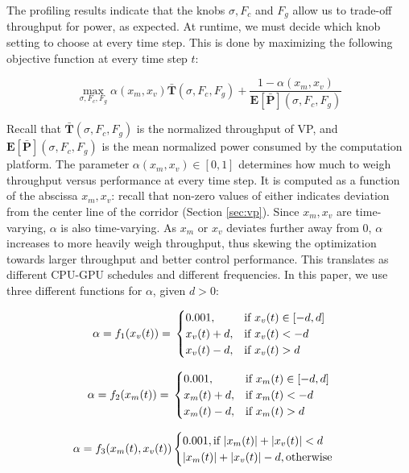 
The profiling results indicate that the knobs $\sigma, F_c$ and $F_g$ allow us to trade-off throughput for power, as expected.
At runtime, we must decide which knob setting to choose at every time step. 
This is done by maximizing the following objective function at every time step $t$:

\begin{equation}
\max_{\sigma,F_{c},F_{g}} \alpha(x_m,x_v)\mathbf{\bar{T}}(\sigma,F_{c},F_{g}) + \frac{1-\alpha(x_m,x_v)}{\mathbf{E[\bar{P}]}(\sigma,F_{c},F_{g})}
\label{eq:cost_runtime}
\end{equation}

Recall that $\mathbf{\bar{T}}(\sigma,F_{c},F_{g})$ is the normalized throughput of VP, and $\mathbf{E[\bar{P}]}(\sigma,F_{c},F_{g})$ is the mean normalized power consumed by the computation platform.
The parameter $\alpha(x_m,x_v) \in [0,1]$ determines how much to weigh throughput versus performance at every time step. 
It is computed as a function of the abscissa $x_m,x_v$: recall that non-zero values of either indicates deviation from the center line of the corridor (Section \ref{sec:vp}). 
Since $x_m,x_v$ are time-varying, $\alpha$ is also time-varying.
As $x_m$ or $x_v$ deviates further away from 0, $\alpha$ increases to more heavily weigh throughput, thus skewing the optimization towards larger throughput and better control performance.
This translates as different CPU-GPU schedules and different frequencies.
In this paper, we use three different functions for $\alpha$, given $d >0$:

{\footnotesize{
		\begin{equation}
		\alpha= f_1(x_v(t)) = \\
		\begin{cases}
		0.001,&\text{if }x_v(t)\in[-d,d]\\
		x_v(t)+d,&\text{if }x_v(t)<-d\\
		x_v(t)-d,&\text{if }x_v(t)>d
		\end{cases}
		\label{eq:f1}
		\end{equation}
	}}
	
	{\footnotesize{
			\begin{equation}
			\alpha = f_2(x_m(t)) = \\
			\begin{cases}
			0.001,&\text{if }x_m(t)\in[-d,d]\\
			x_m(t)+d,&\text{if }x_m(t)<-d\\
			x_m(t)-d,&\text{if }x_m(t)>d
			\end{cases}
			\label{eq:f2}
			\end{equation}
		}}
		
{\footnotesize{
		\begin{equation}
		\alpha = f_3(x_m(t),x_v(t)) \\
		\begin{cases}
		0.001,\text{if }|x_m(t)|+|x_v(t)|<d\\
		|x_m(t)|+|x_v(t)|-d,\text{otherwise}\\
		\end{cases}
		\label{eq:f3}
		\end{equation}
	}}